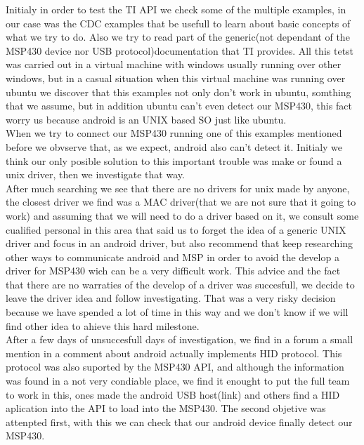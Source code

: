 		Initialy in order to test the TI API we check some of the multiple examples, in our case was the CDC examples that be usefull to learn about basic concepts of what we try to do. Also we try to read part of the generic(not dependant of the MSP430 device nor USB protocol)documentation that TI provides. All this tetst was carried out in a virtual machine with windows usually running over other windows, but in a casual situation when this virtual machine was running over ubuntu we discover that this examples not only don't work in ubuntu, somthing that we assume, but in addition ubuntu can't even detect our MSP430, this fact worry us because android is an UNIX based SO just like ubuntu. \\

		When we try to connect our MSP430 running one of this examples mentioned before we obvserve that, as we expect, android also can't detect it. Initialy we think our only posible solution to this important trouble was make or found a unix driver, then we investigate that way. \\

		After much searching we see that there are no drivers for unix made by anyone, the closest driver we find was a MAC driver(that we are not sure that it going to work) and assuming that we will need to do a driver based on it, we consult some cualified personal in this area that said us to forget the idea of a generic UNIX driver and focus in an android driver, but also recommend that keep researching other ways to communicate android and MSP in order to avoid the develop a driver for MSP430 wich can be a very difficult work. This advice and the fact that there are no warraties of the develop of a driver was succesfull, we decide to leave the driver idea and follow investigating. That was a very risky decision because we have spended a lot of time in this way and we don't know if we will find other idea to ahieve this hard milestone.\\

		After a few days of unsuccesfull days of investigation, we find in a forum a small mention in a comment about android actually implements HID protocol. This protocol was also suported by the MSP430 API, and although the information was found in a not very condiable place, we find it enought to put the full team to work in this, ones made the android USB host(link) and others find a HID aplication into the API to load into the MSP430. The second objetive was attenpted first, with this we can check that our android device finally detect our MSP430. \\


